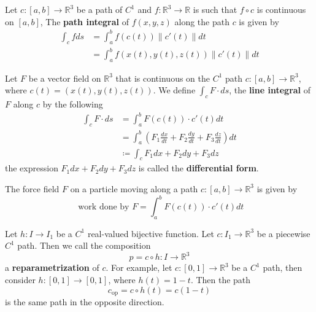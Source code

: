 \documentclass[openany]{book}
\newcommand{\R}{\mathbb{R}}
\begin{document}
\begin{defn}
    Let $c:[a,b]\to\R^3$ be a path of $C^1$ and $f:\R^3\to\R$ is such that $f\circ c$ is continuous on $[a,b]$, The \textbf{path integral} of $f(x,y,z)$ along the path $c$ is given by 
    \begin{align*}
        \int_c fds&=\int_a^bf(c(t))\|c'(t)\|dt\\
        &=\int_a^bf(x(t),y(t), z(t))\|c'(t)\|dt
    \end{align*}
\end{defn}



\begin{defn}
    Let $F$ be a vector field on $\R^3$ that is continuous on the $C^1$ path $c:[a,b]\to\R^3$, where $c(t)=(x(t), y(t), z(t))$. We define $\int_c F\cdot ds$, the \textbf{line integral} of $F$ along $c$ by the following
    \begin{align*}
        \int_c F\cdot ds&=\int_a^bF(c(t))\cdot c'(t)dt\\
        &=\int_a^b \left(F_1\frac{dx}{dt}+F_2\frac{dy}{dt}+F_3\frac{dz}{dt}\right)dt\\
        &\coloneq\int_c F_1dx+F_2dy+F_3dz
    \end{align*}
    the expression $F_1dx+F_2dy+F_3dz$ is called the \textbf{differential form}.
\end{defn}


\begin{defn}
    The force field $F$ on a particle moving along a path $c:[a,b]\to\R^3$ is given by 
    \begin{equation*}
        \text{ work done by } F=\int_a^bF(c(t))\cdot c'(t)dt
    \end{equation*}
\end{defn}

\begin{defn}[reparametrization]
    Let $h: I\to I_1$ be a $C^1$ real-valued bijective function. Let $c: I_1\to\R^3$ be a piecewise $C^1$ path. Then we call the composition 
    \begin{equation*}
        p=c\circ h: I\to\R^3
    \end{equation*}
    a \textbf{ reparametrization} of $c$. For example, let $c:[0,1]\to\R^3$ be a $C^1$ path, then consider $h: [0,1]\to [0,1]$, where $h(t)=1-t$. Then the path 
    \begin{equation*}
        c_{\text{op}}=c\circ h(t)=c(1-t)
    \end{equation*}
    is the same path in the opposite direction.
\end{defn}
\end{document}
